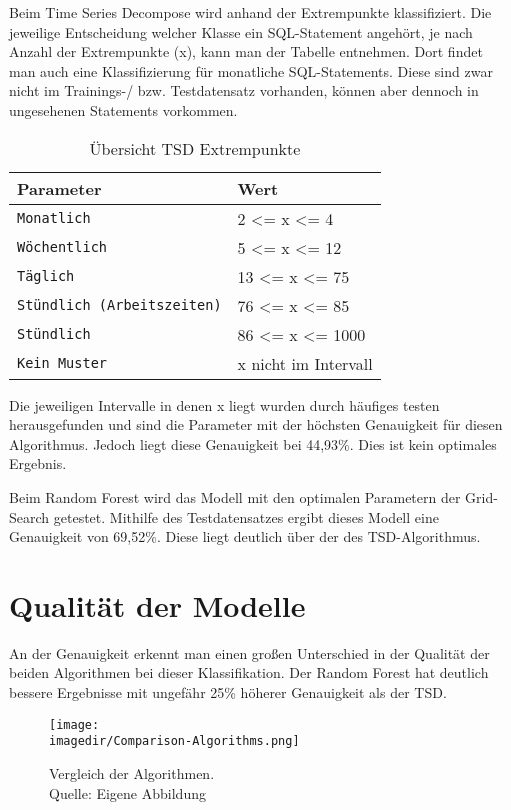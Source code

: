 Beim Time Series Decompose wird anhand der Extrempunkte klassifiziert. Die jeweilige Entscheidung welcher Klasse ein SQL-Statement angehört, je nach Anzahl der Extrempunkte (x), kann man der Tabelle entnehmen. Dort findet man auch eine Klassifizierung für monatliche SQL-Statements. Diese sind zwar nicht im Trainings-/ bzw. Testdatensatz vorhanden, können aber dennoch in ungesehenen Statements vorkommen.

\begin{table}[H]
	\centering
	\begin{tabular}{lp{10cm}}
		\textbf{Parameter} & \textbf{Wert}\\\toprule
		\texttt{Monatlich} & 2 \textless{}= x \textless{}= 4 \\\midrule
		\texttt{Wöchentlich} & 5 \textless{}= x \textless{}= 12 \\\midrule
		\texttt{Täglich} & 13 \textless{}= x \textless{}= 75\\\midrule
		\texttt{Stündlich (Arbeitszeiten)} & 76 \textless{}= x \textless{}= 85\\\midrule
		\texttt{Stündlich} & 86 \textless{}= x \textless{}= 1000\\\midrule
		\texttt{Kein Muster} & x nicht im Intervall
		\\\bottomrule
	\end{tabular}
	\caption{\label{tab:dateien}Übersicht TSD Extrempunkte}
\end{table}

Die jeweiligen Intervalle in denen x liegt wurden durch häufiges testen herausgefunden und sind die Parameter mit der höchsten Genauigkeit für diesen Algorithmus. Jedoch liegt diese Genauigkeit bei 44,93\%. Dies ist kein optimales Ergebnis.

Beim Random Forest wird das Modell mit den optimalen Parametern der Grid-Search getestet. Mithilfe des Testdatensatzes ergibt dieses Modell eine Genauigkeit von 69,52\%. Diese liegt deutlich über der des TSD-Algorithmus.

\section{Qualität der Modelle}

An der Genauigkeit erkennt man einen großen Unterschied in der Qualität der beiden Algorithmen bei dieser Klassifikation. Der Random Forest hat deutlich bessere Ergebnisse mit ungefähr 25\% höherer Genauigkeit als der TSD.

\begin{figure}[H]

	\centering
	\texttt{[image: \\imagedir/Comparison-Algorithms.png]}
	\captionsetup{format=hang}
	\caption[Vergleich der Algorithmen]{\label{fig:test}Vergleich der Algorithmen. \\Quelle: Eigene Abbildung}

\end{figure}

